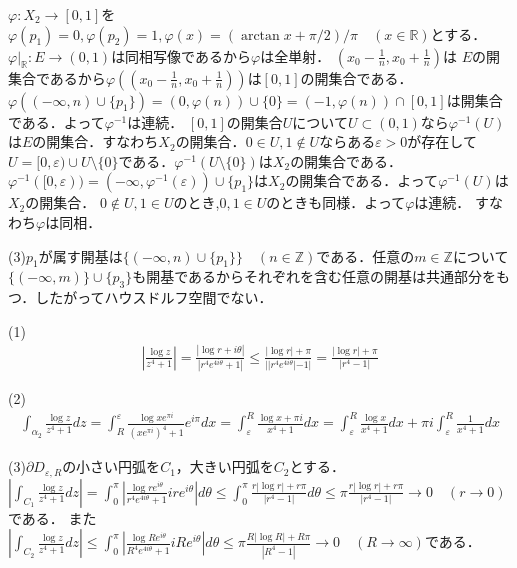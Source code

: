 \documentclass[
		book,
		head_space=20mm,
		foot_space=20mm,
		gutter=10mm,
		line_length=190mm
]{jlreq}
\begin{document}
$\varphi\colon X_2 \rightarrow [0,1]$を
$\varphi(p_1)=0,\varphi(p_2)=1,\varphi(x)=(\arctan x+\pi/2)/\pi \quad (x\in \mathbb{R})$とする．$\varphi|_{\mathbb{R}}\colon E\rightarrow(0,1)$は同相写像であるから$\varphi$は全単射．
$(x_0-\frac{1}{n},x_0+\frac{1}{n})$は $E$の開集合であるから$\varphi((x_0-\frac{1}{n},x_0+\frac{1}{n}))$は$[0,1]$の開集合である．$\varphi((-\infty,n)\cup\{p_1\})=(0,\varphi(n))\cup \{0\}=(-1,\varphi(n))\cap [0,1]$は開集合である．よって$\varphi^{-1}$は連続．
$[0,1]$の開集合$U$について$U \subset (0,1)$なら$\varphi^{-1}(U)$は$E$の開集合．すなわち$X_2$の開集合．$0 \in U,1\notin U$ならある$\varepsilon>0$が存在して$U=[0,\varepsilon)\cup U\setminus\{0\}$である．$\varphi^{-1}(U\setminus \{0\})$は$X_2$の開集合である．$\varphi^{-1}([0,\varepsilon))=(-\infty,\varphi^{-1}(\varepsilon))\cup\{p_1\}$は$X_2$の開集合である．よって$\varphi^{-1}(U)$は$X_2$の開集合．
$0\notin U,1\in U$のとき,$0,1\in U$のときも同様．よって$\varphi$は連続．
すなわち$\varphi$は同相．

(3)$p_1$が属す開基は$\{(-\infty,n)\cup\{p_1\}\}\quad(n\in \mathbb{Z})$である．任意の$m\in \mathbb{Z}$について$ \{ (-\infty,m)\} \cup \{p_3\}$も開基であるからそれぞれを含む任意の開基は共通部分をもつ．したがってハウスドルフ空間でない．

(1)\begin{align}
    \left| \frac{\log z}{z^4+1} \right|= \frac{|\log r + i\theta|}{|r^4e^{4i\theta}+1|}\le \frac{|\log r|+\pi}{||r^4e^{4i\theta}|-1|}= \frac{|\log r|+\pi}{|r^4-1|}
\end{align}

(2)\begin{align}
    \int_{\alpha_2}\frac{\log z}{z^4+1}dz=\int_{R}^{\varepsilon} \frac{\log xe^{\pi i}}{(x e^{\pi i})^4+1}e^{i\pi}dx=\int_{\varepsilon}^R \frac{\log x+\pi i}{x^4+1}dx = \int_{\varepsilon}^R \frac{\log x}{x^4+1}dx + \pi i\int_{\varepsilon}^R \frac{1}{x^4+1}dx
\end{align}

(3)$\partial D_{\varepsilon,R}$の小さい円弧を$C_1$，大きい円弧を$C_2$とする．
$|\int_{C_1}\frac{\log z}{z^4+1}dz|=\int_{0}^\pi |\frac{\log r e^{i\theta}}{r^4e^{4i\theta}+1}i re^{i\theta}|d\theta\le \int_{0}^\pi \frac{r|\log r|+r\pi}{|r^4-1|}d\theta\le \pi \frac{r|\log r|+r\pi}{|r^4-1|}\rightarrow 0\quad (r\rightarrow 0)$である．
また$|\int_{C_2}\frac{\log z}{z^4+1}dz|\le \int_{0}^\pi |\frac{\log Re^{i\theta}}{R^4e^{4i\theta}+1}i Re^{i\theta}|d\theta \le \pi \frac{R|\log R|+R\pi}{|R^4-1|}\rightarrow 0\quad (R\rightarrow \infty)$である．
\end{document}
